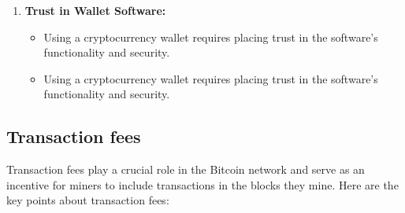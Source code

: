\begin{enumerate}
\begin{itemize}
    \end{itemize}
    \item \textbf{Trust in Wallet Software:}
    \begin{itemize}
        \item Using a cryptocurrency wallet requires placing trust in the software's functionality and security.
        \item Using a cryptocurrency wallet requires placing trust in the software's functionality and security.
    \end{itemize}
\end{enumerate}
\subsection{Transaction fees}
    Transaction fees play a crucial role in the Bitcoin network and serve as an incentive for miners to include transactions in the blocks they mine. Here are the key points about transaction fees:
